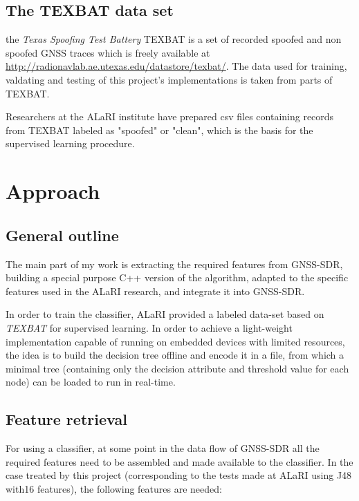 \documentclass[a4paper]{usiinfbachelorproject}
\begin{document}
	\subsection{\textbf{The TEXBAT data set}}
	
the \emph{Texas Spoofing Test Battery} TEXBAT is a set of recorded spoofed and non spoofed GNSS traces which is freely
available at \href{http://radionavlab.ae.utexas.edu/datastore/texbat/}{http://radionavlab.ae.utexas.edu/datastore/texbat/}.
The data used for training, valdating and testing of this project's implementations is taken from parts of TEXBAT.

Researchers at the ALaRI institute have prepared csv files containing records from TEXBAT labeled as "spoofed" or
"clean", which is the basis for the supervised learning procedure.




\section{\textbf{Approach}}

	\subsection{\textbf{General outline}}

The main part of my work is extracting the required features from GNSS-SDR, building a special purpose C++ version of the algorithm, adapted to the specific features used in the ALaRI research, and integrate it into GNSS-SDR.

In order to train the classifier, ALaRI provided a labeled data-set based on \emph{TEXBAT} for supervised learning. In order to achieve 
a light-weight implementation capable of running on embedded devices with limited resources, the idea is to build the
decision tree offline and encode it in a file, from which a minimal tree (containing only the decision attribute and threshold value for each node) can be loaded to run in real-time.
		
	\subsection{\textbf{Feature retrieval}}
	
For using a classifier, at some point in the data flow of GNSS-SDR all the required features need to be assembled
and made available to the classifier. In the case treated by this project (corresponding to the tests made at ALaRI
using J48 with16 features), the following features are needed:
\end{document}
